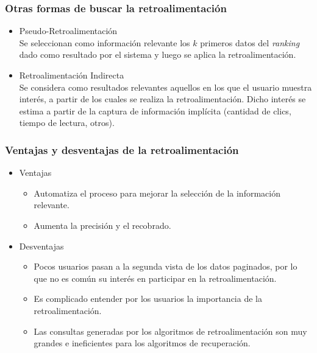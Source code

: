 \documentclass[
10pt, %
aspectratio=169, %
]{beamer}
\begin{document}
	\begin{frame}
		
		\frametitle{Otras formas de buscar la retroalimentación}
		
		\begin{itemize}
			\item Pseudo-Retroalimentación \\ 
			Se seleccionan como información relevante los $k$ primeros datos del \emph{ranking} dado como resultado por el sistema y luego se aplica la retroalimentación.
			
			\item Retroalimentación Indirecta \\ 
			Se considera como resultados relevantes aquellos en los que el usuario muestra interés, a partir de los cuales se realiza la retroalimentación. Dicho interés se estima a partir de la captura de información implícita (cantidad de clics, tiempo de lectura, otros).
		\end{itemize}
		
	\end{frame}
	
	\begin{frame}
		
		\frametitle{Ventajas y desventajas de la retroalimentación}
		
		\begin{itemize}
			\item Ventajas
			\begin{itemize}
				\item Automatiza el proceso para mejorar la selección de la información relevante.
				
				\item Aumenta la precisión y el recobrado.
			\end{itemize}
			
			\vspace{2\baselineskip}
			
			\item Desventajas
			\begin{itemize}
				\item Pocos usuarios pasan a la segunda vista de los datos paginados, por lo que no es común su interés en participar en la retroalimentación.
				
				\item Es complicado entender por los usuarios la importancia de la retroalimentación.
				
				\item Las consultas generadas por los algoritmos de retroalimentación son muy grandes e ineficientes para los algoritmos de recuperación.
				
			\end{itemize}
		
		\end{itemize}
		
	\end{frame}
	
\end{document}
